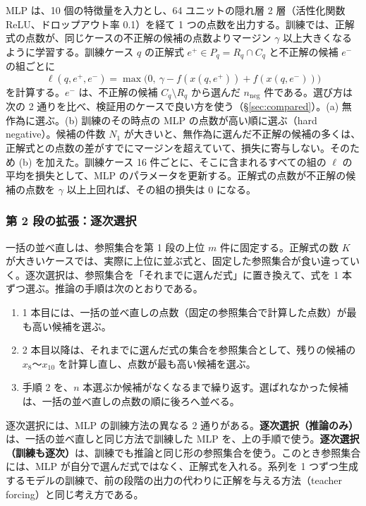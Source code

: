 \documentclass[11pt,a4paper]{ltjsarticle}
\begin{document}
MLP は、10 個の特徴量を入力とし、64 ユニットの隠れ層 2 層（活性化関数 ReLU、ドロップアウト率 0.1）を経て 1 つの点数を出力する。訓練では、正解式の点数が、同じケースの不正解の候補の点数よりマージン $\gamma$ 以上大きくなるように学習する。訓練ケース $q$ の正解式 $e^+ \in P_q = R_q \cap C_q$ と不正解の候補 $e^-$ の組ごとに
\begin{equation}
  \ell(q, e^+, e^-) = \max\bigl(0,\ \gamma - f(x(q, e^+)) + f(x(q, e^-))\bigr)
  \label{eq:loss}
\end{equation}
を計算する。$e^-$ は、不正解の候補 $C_q \setminus R_q$ から選んだ $n_{\mathrm{neg}}$ 件である。選び方は次の 2 通りを比べ、検証用のケースで良い方を使う（\S\ref{sec:compared}）。(a) 無作為に選ぶ。(b) 訓練のその時点の MLP の点数が高い順に選ぶ（hard negative）。候補の件数 $N_1$ が大きいと、無作為に選んだ不正解の候補の多くは、正解式との点数の差がすでにマージンを超えていて、損失に寄与しない。そのため (b) を加えた。訓練ケース 16 件ごとに、そこに含まれるすべての組の $\ell$ の平均を損失として、MLP のパラメータを更新する。正解式の点数が不正解の候補の点数を $\gamma$ 以上上回れば、その組の損失は 0 になる。

\subsubsection{第 2 段の拡張：逐次選択}\label{sec:seqmethod}
一括の並べ直しは、参照集合を第 1 段の上位 $m$ 件に固定する。正解式の数 $K$ が大きいケースでは、実際に上位に並ぶ式と、固定した参照集合が食い違っていく。逐次選択は、参照集合を「それまでに選んだ式」に置き換えて、式を 1 本ずつ選ぶ。推論の手順は次のとおりである。
\begin{enumerate}[leftmargin=2.2em]
  \item 1 本目には、一括の並べ直しの点数（固定の参照集合で計算した点数）が最も高い候補を選ぶ。
  \item 2 本目以降は、それまでに選んだ式の集合を参照集合として、残りの候補の $x_8$〜$x_{10}$ を計算し直し、点数が最も高い候補を選ぶ。
  \item 手順 2 を、$n$ 本選ぶか候補がなくなるまで繰り返す。選ばれなかった候補は、一括の並べ直しの点数の順に後ろへ並べる。
\end{enumerate}
逐次選択には、MLP の訓練方法の異なる 2 通りがある。\textbf{逐次選択（推論のみ）}は、一括の並べ直しと同じ方法で訓練した MLP を、上の手順で使う。\textbf{逐次選択（訓練も逐次）}は、訓練でも推論と同じ形の参照集合を使う。このとき参照集合には、MLP が自分で選んだ式ではなく、正解式を入れる。系列を 1 つずつ生成するモデルの訓練で、前の段階の出力の代わりに正解を与える方法（teacher forcing）と同じ考え方である。
\end{document}
